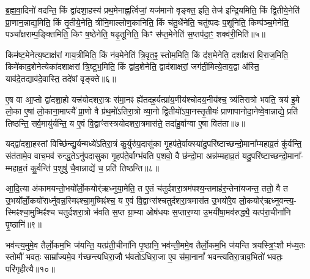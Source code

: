{\anuvakamend[{व्याह॒ स दृ॑शी॒कवो᳚\-ऽर्चि॒तारः॒ स एक॑ञ्च॥१॥}]}

ब्र॒ह्म॒वा॒दिनो॑ वदन्ति॒ किं द्वा॑दशा॒हस्य॑ प्रथ॒मेनाह्न॒र्त्विजां॒ यज॑मानो वृङ्क्त॒ इति॒ तेज॑ इन्द्रि॒यमिति॒ किं द्वि॒तीये॒नेति॑ प्रा॒णान॒न्नाद्य॒मिति॒ किं तृ॒तीये॒नेति॒ त्रीनि॒माल्लोण॒कानिति॒ किं च॑तु॒र्थेनेति॒ चतु॑ष्पदः प॒शूनिति॒ किम्प॑ञ्च॒मेनेति॒ पञ्चा᳚क्षराम्प॒ङ्क्तिमिति॒ किꣳ ष॒ष्ठेनेति॒ षडृ॒तूनिति॒ किꣳ स॑प्त॒मेनेति॑ स॒प्तप॑दा॒ꣳ॒ शक्व॑री॒मिति॑॥५॥

किम॑ष्ट॒मेनेत्य॒ष्टाक्ष॑रां गाय॒त्रीमिति॒ किं न॑व॒मेनेति॑ त्रि॒वृत॒ꣴ॒ स्तोम॒मिति॒ किं द॑श॒मेनेति॒ दशा᳚क्षरां वि॒राज॒मिति॒ किमे॑काद॒शेनेत्येका॑दशाक्षरां त्रि॒ष्टुभ॒मिति॒ किं द्वा॑द॒शेनेति॒ द्वाद॑शाक्षरां॒ जग॑ती॒मित्ये॒ताव॒द्वा अ॑स्ति॒ याव॑दे॒तद्याव॑दे॒वास्ति॒ तदे॑षां वृङ्क्ते॥६॥

{\anuvakamend[{शक्व॑री॒मित्येक॑चत्वारिꣳशच्च॥२॥}]}

ए॒ष वा आ॒प्तो द्वा॑दशा॒हो यत्त्र॑योदशरा॒त्रः स॑मा॒नꣴ ह्ये॑तदह॒र्यत्प्रा॑य॒णीय॑श्चोदय॒नीय॑श्च॒ त्र्य॑तिरात्रो भवति॒ त्रय॑ इ॒मे लो॒का ए॒षां लो॒काना॒माप्त्यै᳚ प्रा॒णो वै प्र॑थ॒मो॑\-ऽतिरा॒त्रो व्या॒नो द्वि॒तीयो॑\-ऽपा॒नस्तृ॒तीयः॑ प्राणापानोदा॒नेष्वे॒वान्नाद्ये॒ प्रति॑ तिष्ठन्ति॒ सर्व॒मायु॑र्यन्ति॒ य ए॒वं वि॒द्वाꣳ॑सस्त्रयोदशरा॒त्रमास॑ते॒ तदा॑हु॒र्वाग्वा ए॒षा वित॑ता॥७॥

यद्द्वा॑दशा॒हस्तां विच्छि॑न्द्यु॒र्यन्मध्ये॑\-ऽतिरा॒त्रं कु॒र्युरु॑प॒दासु॑का गृ॒हप॑ते॒र्वाक्स्या॑दु॒परि॑ष्टाच्छन्दो॒माना᳚म्महाव्र॒तं कु॑र्वन्ति॒ संत॑तामे॒व वाच॒मव॑ रुन्द्ध॒ते\-ऽनु॑पदासुका गृ॒हप॑ते॒र्वाग्भ॑वति प॒शवो॒ वै छ॑न्दो॒मा अन्न॑म्महाव्र॒तं यदु॒परि॑ष्टाच्छन्दो॒माना᳚- म्महाव्र॒तं कु॒र्वन्ति॑ प॒शुषु॑ चै॒वान्नाद्ये॑ च॒ प्रति॑ तिष्ठन्ति॥८॥

{\anuvakamend[{वित॑ता॒ त्रिच॑त्वारिꣳशच्च॥३॥}]}

आ॒दि॒त्या अ॑कामयन्तो॒भयो᳚र्लो॒कयोर्॑ऋध्नुया॒मेति॒ त ए॒तं च॑तुर्दशरा॒त्रम॑पश्य॒न्तमाह॑र॒न्तेना॑यजन्त॒ ततो॒ वै त उ॒भयो᳚र्लो॒कयो॑रार्ध्नुवन्न॒स्मिꣴश्चा॒मुष्मिꣴ॑श्च॒ य ए॒वं वि॒द्वाꣳस॑श्चतुर्दशरा॒त्रमास॑त उ॒भयो॑रे॒व लो॒कयोर्\mbox{}॑ऋध्नुवन्त्य॒- स्मिꣴश्चा॒मुष्मिꣴ॑श्च चतुर्दशरा॒त्रो भ॑वति स॒प्त ग्रा॒म्या ओष॑धयः स॒प्तार॒ण्या उ॒भयी॑षा॒मव॑रुद्ध्यै॒ यत्प॑रा॒चीना॑नि पृ॒ष्ठानि॑॥९॥

भव॑न्त्य॒मुमे॒व तैर्लो॒कम॒भि ज॑यन्ति॒ यत्प्र॑ती॒चीना॑नि पृ॒ष्ठानि॒ भव॑न्ती॒ममे॒व तैर्लो॒कम॒भि ज॑यन्ति त्रयस्त्रि॒ꣳ॒शौ म॑ध्य॒तः स्तोमौ॑ भवतः॒ साम्रा᳚ज्यमे॒व ग॑च्छन्त्यधिरा॒जौ भ॑वतो\-ऽधिरा॒जा ए॒व स॑मा॒नानां᳚ भवन्त्यतिरा॒त्राव॒भितो॑ भवतः॒ परि॑गृहीत्यै॥१०॥

{\anuvakamend[{पृ॒ष्ठानि॒ चतु॑स्त्रिꣳशच्च॥४॥}]}

